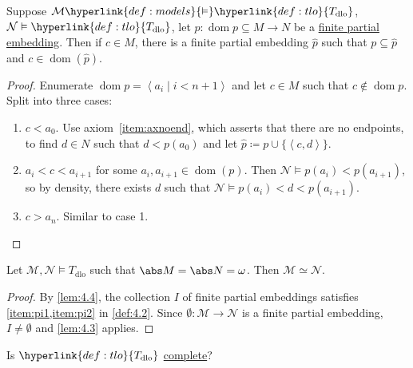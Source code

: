 \documentclass{article}
\let\models\vDash
\DeclareMathOperator{\dom}{dom}
\newcommand{\named}[1]{\textbf{#1}\index{#1}}
\begin{document}
\begin{nlemma}\label{lem:4.4}
  Suppose $\mathcal{M} \hyperlink{def:models}{\models} \hyperlink{def:tlo}{T_{\text{dlo}}}$, $\mathcal{N} \models \hyperlink{def:tlo}{T_{\text{dlo}}}$, let $p: \dom p \subseteq M \to N$ be a \hyperlink{def:pe}{finite partial embedding}.
  Then if $c \in M$, there is a finite partial embedding $\hat{p}$ such that $p \subseteq \hat{p}$ and $c \in \dom(\hat{p})$.
\end{nlemma}
\begin{proof}
  Enumerate $\dom p = \left< a_i \mid i < n+1 \right>$ and let $c \in M$ such that $c \not\in \dom p$.
  Split into three cases:
  \begin{enumerate}[label=\arabic*.]
    \item $c < a_0$. Use axiom~\ref{item:axnoend}, which asserts that there are no endpoints, to find $d \in N$ such that $d < p(a_0)$ and let $\hat p \coloneqq p \cup \{ \left< c,d \right> \}$.
    \item $a_i < c < a_{i+1}$ for some $a_i, a_{i+1} \in \dom(p)$.
      Then $\mathcal{N} \models p(a_i) < p(a_{i+1})$, so by density, there exists $d$ such that $\mathcal{N} \models p(a_i) < d < p(a_{i+1})$.
     \item $c > a_n$. Similar to case 1. \qedhere
  \end{enumerate}
\end{proof}

\begin{nthm} \label{thm:4.5}
Let $\mathcal{M}, \mathcal{N} \models T_{\text{dlo}}$ such that $\abs M = \abs N = \omega$. Then $\mathcal M \simeq \mathcal N$.
\end{nthm}

\begin{proof}
By \cref{lem:4.4}, the collection $I$ of finite partial embeddings satisfies  \cref{item:pi1,item:pi2} in \cref{def:4.2}. Since $\emptyset: \mathcal{M} \to \mathcal{N}$ is a finite partial embedding, $I \neq \emptyset$ and \cref{lem:4.3} applies. 
\end{proof}

Is $\hyperlink{def:tlo}{T_{\text{dlo}}}$ \hyperlink{def:complete}{complete}?
\end{document}
